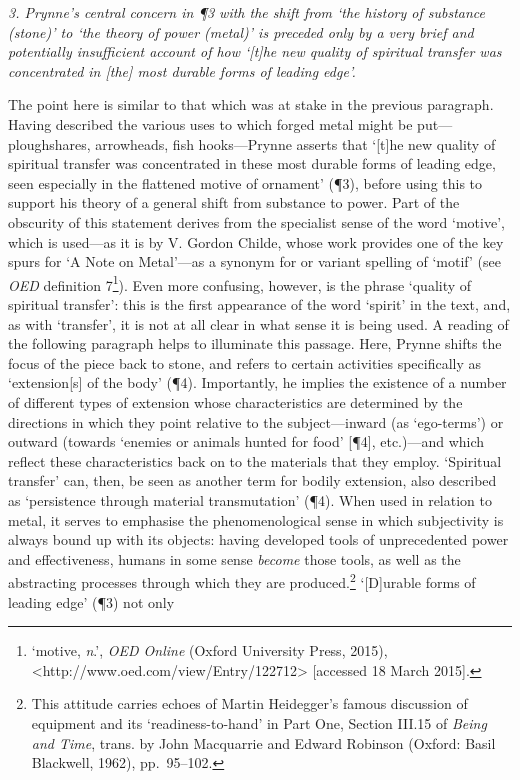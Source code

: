 \documentclass[]{article}
\begin{document}
\emph{3. Prynne's central concern in ¶3 with the shift from `the history
of substance (stone)' to `the theory of power (metal)' is preceded only
by a very brief and potentially insufficient account of how `{[}t{]}he
new quality of spiritual transfer was concentrated in {[}the{]} most
durable forms of leading edge'.}

The point here is similar to that which was at stake in the previous
paragraph. Having described the various uses to which forged metal might
be put---ploughshares, arrowheads, fish hooks---Prynne asserts that
`{[}t{]}he new quality of spiritual transfer was concentrated in these
most durable forms of leading edge, seen especially in the flattened
motive of ornament' (¶3), before using this to support his theory of a
general shift from substance to power. Part of the obscurity of this
statement derives from the specialist sense of the word `motive', which
is used---as it is by V. Gordon Childe, whose work provides one of the
key spurs for `A Note on Metal'---as a synonym for or variant spelling
of `motif' (see \emph{OED} definition 7\footnote{`motive, \emph{n}.',
  \emph{OED Online} (Oxford University Press, 2015),
  \textless{}http://www.oed.com/view/Entry/122712\textgreater{}
  {[}accessed 18 March 2015{]}.}). Even more confusing, however, is the
phrase `quality of spiritual transfer': this is the first appearance of
the word `spirit' in the text, and, as with `transfer', it is not at all
clear in what sense it is being used. A reading of the following
paragraph helps to illuminate this passage. Here, Prynne shifts the
focus of the piece back to stone, and refers to certain activities
specifically as `extension{[}s{]} of the body' (¶4). Importantly, he
implies the existence of a number of different types of extension whose
characteristics are determined by the directions in which they point
relative to the subject---inward (as `ego-terms') or outward (towards
`enemies or animals hunted for food' {[}¶4{]}, etc.)---and which reflect
these characteristics back on to the materials that they employ.
`Spiritual transfer' can, then, be seen as another term for bodily
extension, also described as `persistence through material
transmutation' (¶4). When used in relation to metal, it serves to
emphasise the phenomenological sense in which subjectivity is always
bound up with its objects: having developed tools of unprecedented power
and effectiveness, humans in some sense \emph{become} those tools, as
well as the abstracting processes through which they are
produced.\footnote{This attitude carries echoes of Martin Heidegger's
  famous discussion of equipment and its `readiness-to-hand' in Part
  One, Section III.15 of \emph{Being and Time}, trans. by John
  Macquarrie and Edward Robinson (Oxford: Basil Blackwell, 1962),
  pp.~95--102.} `{[}D{]}urable forms of leading edge' (¶3) not only
\end{document}
